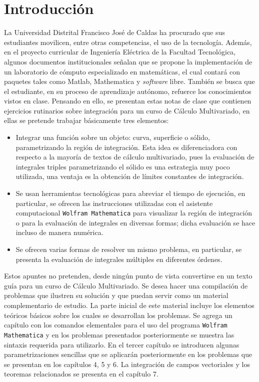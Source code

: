 \chapter*{Introducción}

La Universidad Distrital Francisco José de Caldas ha procurado que sus estudiantes movilicen, entre otras competencias,
el uso de la tecnología. Además, en el proyecto curricular de Ingeniería Eléctrica de la Facultad Tecnológica, algunos documentos institucionales señalan que se propone la implementación de un laboratorio de cómputo especializado en matemáticas, el cual contará con paquetes tales como Matlab, Mathematica y \emph{software} libre.
También se busca que el estudiante, en su proceso de aprendizaje autónomo, refuerce los conocimientos vistos en clase.
Pensando en ello, se presentan estas notas de clase que contienen ejercicios
rutinarios sobre integración para un curso de Cálculo Multivariado, en ellas se pretende trabajar básicamente tres elementos:
\begin{itemize}
  \item Integrar una función sobre un objeto: curva, superficie o sólido, parametrizando la región de integración.
    Esta idea es diferenciadora con respecto a la mayoría de textos de cálculo multivariado, pues la evaluación de integrales triples parametrizando el sólido es una estrategia muy poco utilizada, una ventaja es la obtención de límites constantes de integración.
  \item Se usan herramientas tecnológicas para abreviar el tiempo de ejecución, en particular, se ofrecen las instrucciones utilizadas con el asistente computacional \verb"Wolfram Mathematica" para visualizar la región de integración o para la evaluación de integrales en diversas formas; dicha evaluación se hace incluso de manera numérica.
  \item Se ofrecen varias formas de resolver un mismo problema, en particular, se presenta la evaluación de integrales múltiples en diferentes órdenes.
\end{itemize}
Estos apuntes no pretenden, desde ningún punto de vista convertirse en un texto guía para un curso de Cálculo Multivariado.
Se desea hacer una compilación de problemas que ilustren su solución y que puedan servir como un material complementario de estudio.
La parte inicial de este material incluye los elementos teóricos básicos sobre los cuales se desarrollan los problemas.
Se agrega un capítulo con los comandos elementales para el uso del programa \verb"Wolfram Mathematica"
y en los problemas presentados posteriormente se muestra las sintaxis requerida para utilizarlo.
En el tercer capítulo se introducen algunas parametrizaciones sencillas que se aplicarán posteriormente en los problemas que se
presentan en los capítulos 4, 5 y 6.
La integración de campos vectoriales y los teoremas relacionados se presenta en el capítulo 7.

